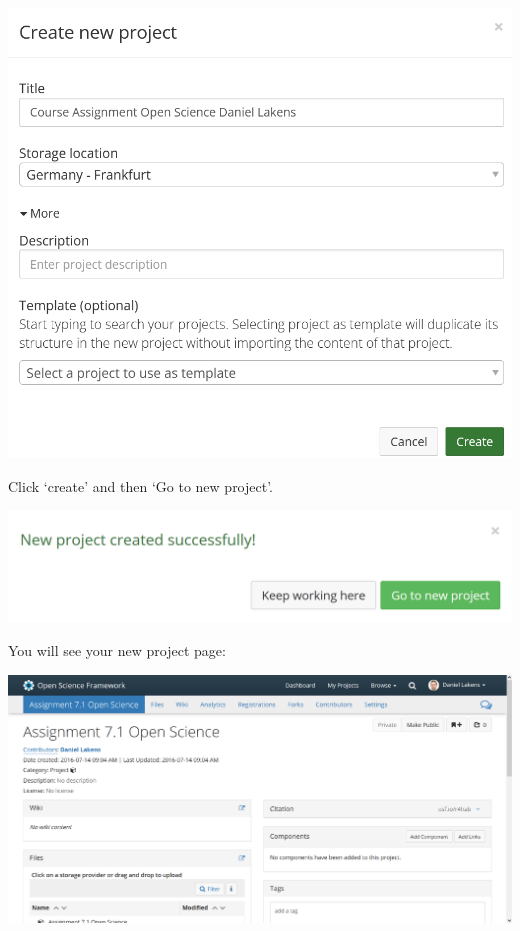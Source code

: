 \documentclass[
  oneside]{krantz}
\begin{document}
\begin{center}\includegraphics[width=1\linewidth]{images/newosfproject} \end{center}

Click `create' and then `Go to new project'.

\begin{center}\includegraphics[width=1\linewidth]{images/34c3f0068911af6749513b1584c4cac7} \end{center}

You will see your new project page:

\begin{center}\includegraphics[width=1\linewidth]{images/661cad8c112cd6c52562bed3cf6a5cd5} \end{center}
\end{document}
